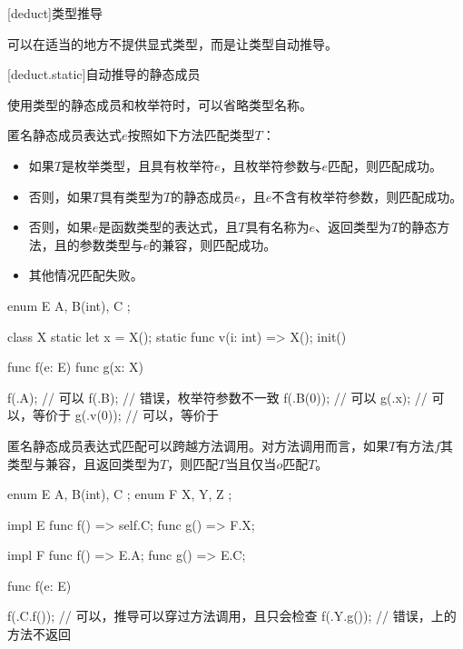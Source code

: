 
[deduct]{类型推导}

\pnum
\X 可以在适当的地方不提供显式类型，而是让类型自动推导。

[deduct.static]{自动推导的静态成员}

\pnum
使用类型的静态成员和枚举符时，可以省略类型名称。

\pnum
匿名静态成员表达式$e$按照如下方法匹配类型$T$：

\begin{itemize}
    \item 如果$T$是枚举类型，且具有枚举符$e$，且枚举符参数与$e$匹配，则匹配成功。
    \item 否则，如果$T$具有类型为$T$的静态成员$e$，且$e$不含有枚举符参数，则匹配成功。
    \item 否则，如果$e$是函数类型的表达式，且$T$具有名称为$e$、返回类型为$T$的静态方法，且的参数类型与$e$的兼容，则匹配成功。
    \item 其他情况匹配失败。
\end{itemize}

\enterexample
\begin{codeblock}
enum E { A, B(int), C };

class X {
    static let x = X();
    static func v(i: int) => X();
    init() { }
}

func f(e: E) { }
func g(x: X) { }

f(.A); // 可以
f(.B); // 错误，枚举符参数不一致
f(.B(0)); // 可以
g(.x); // 可以，等价于
g(.v(0)); // 可以，等价于

\end{codeblock}
\exitexample

\pnum
匿名静态成员表达式匹配可以跨越方法调用。对方法调用而言，如果$T$有方法$f$其类型与兼容，且返回类型为$T$，则匹配$T$当且仅当$o$匹配$T$。

\enterexample
\begin{codeblock}
enum E { A, B(int), C };
enum F { X, Y, Z };

impl E {
    func f() => self.C;
    func g() => F.X;
}

impl F {
    func f() => E.A;
    func g() => E.C;
}

func f(e: E) { }

f(.C.f()); // 可以，推导可以穿过方法调用，且只会检查
f(.Y.g()); // 错误，上的方法不返回

\end{codeblock}
\exitexample